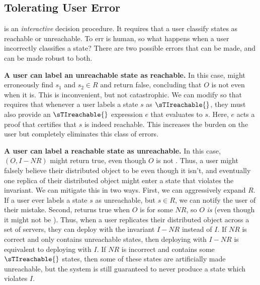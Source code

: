 {}

\subsection{Tolerating User Error}
 is an \emph{interactive} decision
procedure. It requires that a user classify states as reachable or unreachable.
To err is human, so what happens when a user incorrectly classifies a state?
There are two possible errors that can be made, and
 can be made robust to both.

\textbf{A user can label an unreachable state as reachable.}
In this case, \Helper{} might erroneously find $s_1$ and $s_2 \in R$ and return
false, concluding that $O$ is not \sTIconfluent{} even when it is.  This is
inconvenient, but not catastrophic. We can modify
 so that \Helper{} requires that whenever
a user labels a state $s$ as $\sTIreachable{}$, they must also provide an
$\sTIreachable{}$ expression $e$ that evaluates to $s$. Here, $e$ acts a proof
that certifies that $s$ is indeed reachable. This increases the burden on the
user but completely eliminates this class of errors.

\textbf{A user can label a reachable state as unreachable.}
In this case, \IsIclosed$(O, I - NR)$ might return true, even though $O$ is not
\sTIconfluent. Thus, a user might falsely believe their distributed object to
be \sTIconfluent{} even though it isn't, and eventually one replica of their
distributed object might enter a state that violates the invariant.
%
We can mitigate this in two ways. First, we can aggressively expand $R$. If a
user ever labels a state $s$ as unreachable, but $s \in R$, we can notify the
user of their mistake. Second, \Helper{} returns true when $O$ is  for some $NR$, so $O$ \emph{is}  (even though
it might not be \sTIconfluent{}). Thus, when a user replicates their
distributed object across a set of servers, they can deploy with the invariant
$I - NR$ instead of $I$. If $NR$ is correct and only contains unreachable
states, then deploying with $I - NR$ is equivalent to deploying with $I$. If
$NR$ is incorrect and contains some $\sTIreachable{}$ states, then some of
these states are artificially made unreachable, but the system is still
guaranteed to never produce a state which violates $I$.
